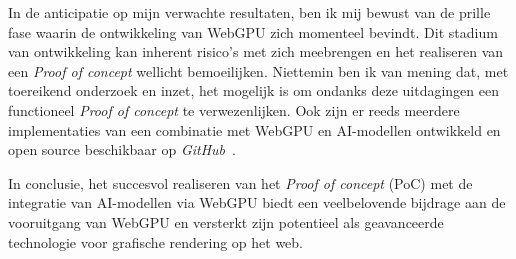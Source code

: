 In de anticipatie op mijn verwachte resultaten, ben ik mij bewust van de prille fase waarin de ontwikkeling van WebGPU zich momenteel bevindt. Dit stadium van ontwikkeling kan inherent risico's met zich meebrengen en het realiseren van een \textit{Proof of concept} wellicht bemoeilijken. Niettemin ben ik van mening dat, met toereikend onderzoek en inzet, het mogelijk is om ondanks deze uitdagingen een functioneel \textit{Proof of concept} te verwezenlijken. Ook zijn er reeds meerdere implementaties van een combinatie met WebGPU en AI-modellen ontwikkeld en open source beschikbaar op \textit{GitHub}~\autocite{mlcai2023}.

\bigbreak{}
In conclusie, het succesvol realiseren van het \textit{Proof of concept} (PoC) met de integratie van AI-modellen via WebGPU biedt een veelbelovende bijdrage aan de vooruitgang van WebGPU en versterkt zijn potentieel als geavanceerde technologie voor grafische rendering op het web.

\pagebreak
